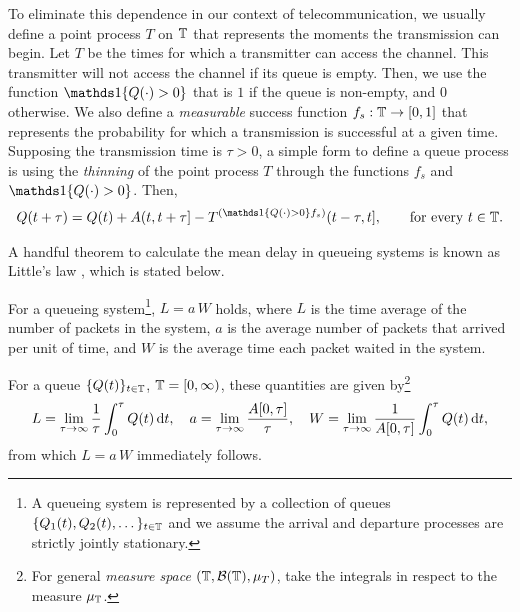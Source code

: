 To eliminate this dependence in our context of telecommunication, we usually define a point process $T$ on ${\mathbb T}$ that represents the moments the transmission can begin.
%
Let $T$ be the times for which a transmitter can access the channel.
%
This transmitter will not access the channel if its queue is empty.
Then, we use the function $\ind\{Q(\cdot) > 0\}$ that is $1$ if the queue is non-empty, and $0$ otherwise.
%
%
We also define a \textit{measurable} success function $f_s:{\mathbb T}\to[0,1]$ that represents the probability for which a transmission is successful at a given time.
%
Supposing the transmission time is $\tau>0$, a simple form to define a queue process is using the \textit{thinning} of the point process $T$ through the functions $f_s$ and $\ind\{Q(\cdot) > 0\}$. Then,
\begin{align} \label{eq:def_queue}
    Q(t+\tau) = Q(t) + A(t,t+\tau] - T^{(\ind\{Q(\cdot) > 0\} f_s)}(t-\tau,t], \qquad \text{for every} ~ t\in\T.
\end{align}

A handful theorem to calculate the mean delay in queueing systems is known as Little's law \cite{little1961proof}, which is stated below.

\begin{theorem} \label{th:little}
    For a queueing system\footnote{A queueing system is represented by a collection of queues $\{Q_1(t), Q_2(t), \dots\}_{t\in{\mathbb T}}$ and we assume the arrival and departure processes are strictly jointly stationary.}, $L = a\,W$ holds, where $L$ is the time average of the number of packets in the system, $a$ is the average number of packets that arrived per unit of time, and $W$ is the average time each packet waited in the system.
    
    For a queue $\{Q(t)\}_{t\in{\mathbb T}}$, ${\mathbb T}=[0,\infty)$, these quantities are given by\footnote{For general \textit{measure space} $({\mathbb T},\mathcal{B}({\mathbb T}),\mu_T)$, take the integrals in respect to the measure $\mu_{\mathbb T}$.}
    \begin{align*}
        L = \lim_{\tau\to\infty} \frac{1}{\tau} \int_0^\tau Q(t)\,\mathrm{d} t,
        \quad
        a = \lim_{\tau\to\infty} \frac{A[0,\tau]}{\tau},
        \quad
        W = \lim_{\tau\to\infty} \frac{1}{A[0,\tau]} \int_0^\tau Q(t)\,\mathrm{d} t,
    \end{align*}
    from which $L = a\,W$ immediately follows.
\end{theorem}

